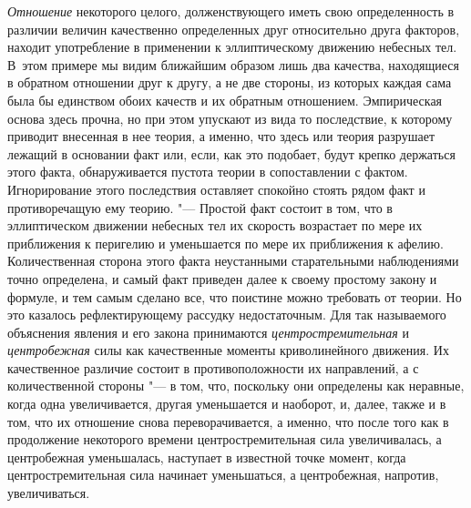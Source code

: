 {\em Отношение} некоторого целого, долженствующего иметь
свою определенность в различии величин качественно определенных друг
относительно друга факторов, находит употребление в применении к
эллиптическому движению небесных тел. В~этом примере мы видим ближайшим
образом лишь два качества, находящиеся в обратном отношении друг к другу, а
не две стороны, из которых каждая сама была бы единством обоих качеств и их
обратным отношением. Эмпирическая основа здесь прочна, но при этом упускают
из вида то последствие, к которому приводит внесенная в нее теория, а
именно, что здесь или теория разрушает лежащий в основании факт или, если,
как это подобает, будут крепко держаться этого факта, обнаруживается
пустота теории в сопоставлении с фактом. Игнорирование этого последствия
оставляет спокойно стоять рядом факт и противоречащую ему теорию. "--- Простой
факт состоит в том, что в эллиптическом движении небесных тел их скорость
возрастает по мере их приближения к перигелию и уменьшается по мере их
приближения к афелию. Количественная сторона этого факта неустанными
старательными наблюдениями точно определена, и самый факт приведен далее к
своему простому закону и формуле, и тем самым сделано все, что поистине
можно требовать от теории. Но это казалось рефлектирующему рассудку
недостаточным. Для так называемого объяснения явления и его закона
принимаются {\em центростремительная} и
{\em центробежная} силы как качественные моменты
криволинейного движения. Их качественное различие состоит в
противоположности их направлений, а с количественной стороны "--- в том, что,
поскольку они определены как неравные, когда одна увеличивается, другая
уменьшается и наоборот, и, далее, также и в том, что их отношение снова
переворачивается, а именно, что после того как в продолжение некоторого
времени центростремительная сила увеличивалась, а центробежная уменьшалась,
наступает в известной точке момент, когда центростремительная сила начинает
уменьшаться, а центробежная, напротив,
увеличиваться.

